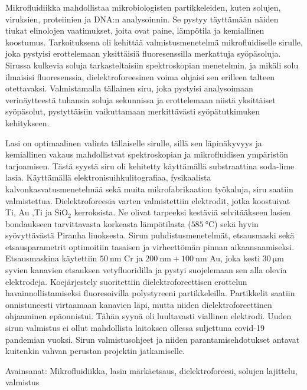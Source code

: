 \documentclass[final]{jyflluk}
\begin{document}
{
\noindent Mikrofluidiikka mahdollistaa mikrobiologisten partikkeleiden, kuten solujen, viruksien, proteiinien ja DNA:n analysoinnin. Se pystyy täyttämään näiden tiukat elin\-olojen vaatimukset, joita ovat paine, lämpötila ja kemiallinen koostumus. Tarkoituksena oli kehittää valmistusmenetelmä mikrofluidiselle si\-rul\-le, joka pystyisi erottelemaan yksittäisiä fluoresenssilla merkattuja syöpäsoluja. Sirussa kulkevia soluja tarkasteltaisiin spektroskopian menetelmin, ja mikäli solu ilmaisisi fluoresenssia, dielektroforeesinen voima ohjaisi sen erilleen talteen otettavaksi. Valmistamalla tällainen siru, joka pystyisi analysoimaan verinäytteestä tuhansia soluja sekunnissa ja erottelemaan niistä yksittäiset syöpäsolut, pystyttäisiin vaikuttamaan merkittävästi syöpätutkimuken kehitykseen. 

Lasi on optimaalinen valinta tällaiselle sirulle, sillä sen läpinäkyvyys ja kemiallinen vakaus mahdollistvat spektroskopian ja mikrofluidisen ympäristön tarjoamisen. Tästä syystä siru oli kehitetty käyttämällä substraattina soda-lime lasia. Käyttämällä elektronisuihkulitografiaa, fysikaalista kalvonkasvatusmenetelmää sekä muita mikrofabrikaation työkaluja, siru saatiin valmistettua. Dielektroforeesia varten valmistettiin elektrodit, jotka koostuivat Ti, Au ,Ti ja $\mathrm{SiO_2}$ kerroksista. Ne olivat tarpeeksi kestäviä selvitääkseen lasien bondaukseen tarvittavasta korkeasta lämpötilasta ($\SI{585}{\celsius}$) sekä hyvin syövyttävästä Piranha liuoksesta. Sirun puhdistusmenetelmät, etsausmaski sekä etsausparametrit optimoitiin tasaisen ja virheettömän pinnan aikaansaamiseksi. Etsausmaskina käytettiin $\SI{50}{\nano \metre}$ Cr ja $\SI{200}{\nano \metre} + \SI{100}{\nano \metre}$ Au, joka kesti $\SI{30}{\micro \metre}$ syvien kanavien etsauksen vetyfluoridilla ja pystyi suojelemaan sen alla olevia elektrodeja. Koejärjestely suoritettiin dielektroforeettisen erottelun havainnollistamiseksi fluoresoivilla polystyreeni partikkeleilla. Partikkelit saatiin onnistuneesti virtaamaan kanavien läpi, mutta niiden dielektroforeettinen ohjaaminen epäonnistui. Tähän syynä oli luultavasti viallinen elektrodi. Uuden sirun valmistus ei ollut mahdollista laitoksen ollessa suljettuna covid-19 pandemian vuoksi. Sirun val\-mis\-tus\-ohjeet ja niiden parantamisehdotukset antavat kuitenkin vahvan perustan projektin jatkamiselle. 

}

\bigskip 

\noindent Avainsanat: Mikrofluidiikka, lasin märkäetsaus, dielektroforeesi, solujen lajittelu, valmistus
\end{document}
